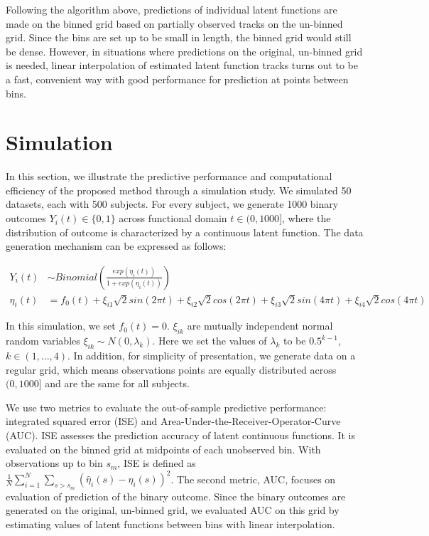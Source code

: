 \documentclass[
  11pt,
]{article}
\begin{document}
Following the algorithm above, predictions of individual latent
functions are made on the binned grid based on partially observed tracks
on the un-binned grid. Since the bins are set up to be small in length,
the binned grid would still be dense. However, in situations where
predictions on the original, un-binned grid is needed, linear
interpolation of estimated latent function tracks turns out to be a
fast, convenient way with good performance for prediction at points
between bins.

\hypertarget{simulation}{%
\section{Simulation}\label{simulation}}

In this section, we illustrate the predictive performance and
computational efficiency of the proposed method through a simulation
study. We simulated 50 datasets, each with 500 subjects. For every
subject, we generate 1000 binary outcomes \(Y_i(t) \in \{0, 1\}\) across
functional domain \(t \in (0, 1000]\), where the distribution of outcome
is characterized by a continuous latent function. The data generation
mechanism can be expressed as follows:

\[\begin{aligned}
Y_i(t) & \sim Binomial(\frac{exp(\eta_i(t))}{1+exp(\eta_i(t))}) \\
\eta_i(t) &= f_0(t)+ \xi_{i1}\sqrt{2}sin(2\pi t)+\xi_{i2}\sqrt{2}cos(2\pi t)+\xi_{i3}\sqrt{2}sin(4\pi t)+\xi_{i4}\sqrt{2}cos(4\pi t)
\end{aligned}\]

In this simulation, we set \(f_0(t) = 0\). \(\xi_{ik}\) are mutually
independent normal random variables \(\xi_{ik}\sim N(0, \lambda_k)\).
Here we set the values of \(\lambda_k\) to be \(0.5^{k-1}\),
\(k \in (1,..., 4)\). In addition, for simplicity of presentation, we
generate data on a regular grid, which means observations points are
equally distributed across \((0, 1000]\) and are the same for all
subjects.

We use two metrics to evaluate the out-of-sample predictive performance:
integrated squared error (ISE) and
Area-Under-the-Receiver-Operator-Curve (AUC). ISE assesses the
prediction accuracy of latent continuous functions. It is evaluated on
the binned grid at midpoints of each unobserved bin. With observations
up to bin \(s_m\), ISE is defined as
\(\frac{1}{N}\sum_{i=1}^N\sum_{s>s_m} (\hat{\eta}_i(s)-\eta_i(s))^2\).
The second metric, AUC, focuses on evaluation of prediction of the
binary outcome. Since the binary outcomes are generated on the original,
un-binned grid, we evaluated AUC on this grid by estimating values of
latent functions between bins with linear interpolation.
\end{document}
